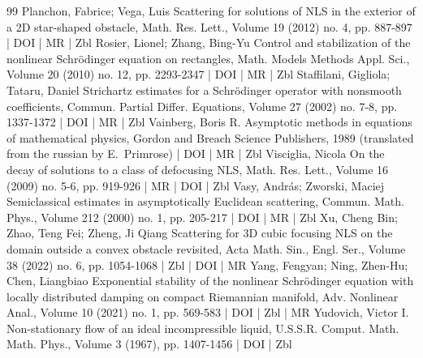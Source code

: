 \documentclass[10pt]{amsart}
\theoremstyle{definition}\newtheorem{defi}[theo]{Definition}\newtheorem{rema}[theo]{Remark}\newtheorem{exam}[theo]{Example}\newtheorem{exem}[theo]{Example}\newtheorem{nota}[theo]{Notation}
\begin{document}
\begin{thebibliography}{99}
Planchon, Fabrice; Vega, Luis Scattering for solutions of NLS in the exterior of a 2D star-shaped obstacle, Math. Res. Lett., Volume 19 (2012) no. 4, pp. 887-897 | DOI | MR | Zbl
Rosier, Lionel; Zhang, Bing-Yu Control and stabilization of the nonlinear Schrödinger equation on rectangles, Math. Models Methods Appl. Sci., Volume 20 (2010) no. 12, pp. 2293-2347 | DOI | MR | Zbl
Staffilani, Gigliola; Tataru, Daniel Strichartz estimates for a Schrödinger operator with nonsmooth coefficients, Commun. Partial Differ. Equations, Volume 27 (2002) no. 7-8, pp. 1337-1372 | DOI | MR | Zbl
Vainberg, Boris R. Asymptotic methods in equations of mathematical physics, Gordon and Breach Science Publishers, 1989 (translated from the russian by E. Primrose) | DOI | MR | Zbl
Visciglia, Nicola On the decay of solutions to a class of defocusing NLS, Math. Res. Lett., Volume 16 (2009) no. 5-6, pp. 919-926 | MR | DOI | Zbl
Vasy, András; Zworski, Maciej Semiclassical estimates in asymptotically Euclidean scattering, Commun. Math. Phys., Volume 212 (2000) no. 1, pp. 205-217 | DOI | MR | Zbl
Xu, Cheng Bin; Zhao, Teng Fei; Zheng, Ji Qiang Scattering for 3D cubic focusing NLS on the domain outside a convex obstacle revisited, Acta Math. Sin., Engl. Ser., Volume 38 (2022) no. 6, pp. 1054-1068 | Zbl | DOI | MR
Yang, Fengyan; Ning, Zhen-Hu; Chen, Liangbiao Exponential stability of the nonlinear Schrödinger equation with locally distributed damping on compact Riemannian manifold, Adv. Nonlinear Anal., Volume 10 (2021) no. 1, pp. 569-583 | DOI | Zbl | MR
Yudovich, Victor I. Non-stationary flow of an ideal incompressible liquid, U.S.S.R. Comput. Math. Math. Phys., Volume 3 (1967), pp. 1407-1456 | DOI | Zbl
\end{thebibliography}
\end{document}
